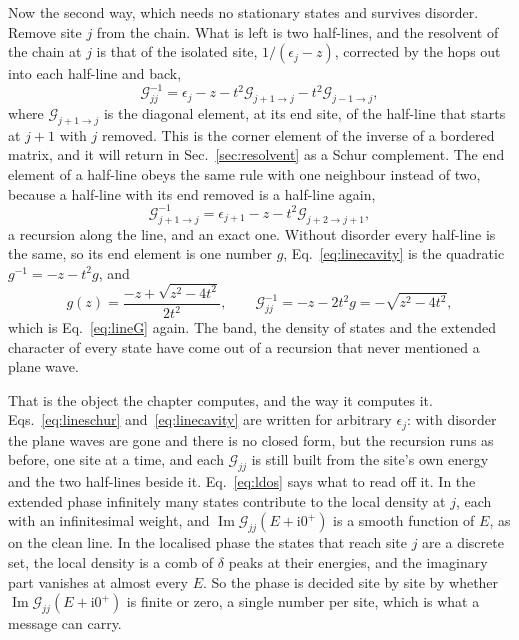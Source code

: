 Now the second way, which needs no stationary states and survives
disorder. Remove site $j$ from the chain. What is left is two half-lines,
and the resolvent of the chain at $j$ is that of the isolated site,
$1/(\epsilon_{j}-z)$, corrected by the hops out into each half-line and
back,
\begin{equation}
  \mathcal{G}_{jj}^{-1}=\epsilon_{j}-z
  -t^{2}\mathcal{G}_{j+1\to j}-t^{2}\mathcal{G}_{j-1\to j},
  \label{eq:lineschur}
\end{equation}
where $\mathcal{G}_{j+1\to j}$ is the diagonal element, at its end site,
of the half-line that starts at $j+1$ with $j$ removed. This is the corner
element of the inverse of a bordered matrix, and it will return in
Sec.~\ref{sec:resolvent} as a Schur complement. The end element of a
half-line obeys the same rule with one neighbour instead of two, because
a half-line with its end removed is a half-line again,
\begin{equation}
  \mathcal{G}_{j+1\to j}^{-1}=\epsilon_{j+1}-z-t^{2}\mathcal{G}_{j+2\to j+1},
  \label{eq:linecavity}
\end{equation}
a recursion along the line, and an exact one. Without disorder every
half-line is the same, so its end element is one number $g$,
Eq.~\eqref{eq:linecavity} is the quadratic $g^{-1}=-z-t^{2}g$, and
\begin{equation}
  g(z)=\frac{-z+\sqrt{z^{2}-4t^{2}}}{2t^{2}},
  \qquad
  \mathcal{G}_{jj}^{-1}=-z-2t^{2}g=-\sqrt{z^{2}-4t^{2}},
  \label{eq:lineg}
\end{equation}
which is Eq.~\eqref{eq:lineG} again. The band, the density of states and
the extended character of every state have come out of a recursion that
never mentioned a plane wave.

That is the object the chapter computes, and the way it computes it.
Eqs.~\eqref{eq:lineschur} and~\eqref{eq:linecavity} are written for
arbitrary $\epsilon_{j}$: with disorder the plane waves are gone and there
is no closed form, but the recursion runs as before, one site at a time,
and each $\mathcal{G}_{jj}$ is still built from the site's own energy and
the two half-lines beside it. Eq.~\eqref{eq:ldos} says what to read off
it. In the extended phase infinitely many states contribute to the local
density at $j$, each with an infinitesimal weight, and
$\operatorname{Im}\mathcal{G}_{jj}(E+\mathrm{i}0^{+})$ is a smooth function
of $E$, as on the clean line. In the localised phase the states that
reach site $j$ are a discrete set, the local density is a comb of
$\delta$ peaks at their energies, and the imaginary part vanishes at
almost every $E$. So the phase is decided site by site by whether
$\operatorname{Im}\mathcal{G}_{jj}(E+\mathrm{i}0^{+})$ is finite or zero, a
single number per site, which is what a message can carry.


